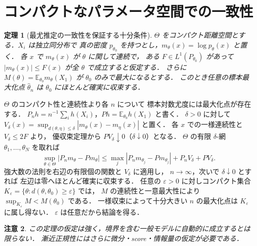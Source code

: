 \documentclass[a5paper,10pt,onecolumn]{jsarticle}
\makeatletter
\theoremstyle{mathnotetheorem}
\newtheorem{theorem}{定理}[section]
\newtheorem{remark}[theorem]{注意}
\renewcommand{\proofname}{証明}
\renewenvironment{proof}[1][\proofname]{%
  \par\pushQED{\qed}\normalfont\topsep4\p@\@plus2\p@\relax
  \trivlist\item[\hskip\labelsep\bfseries #1]\ignorespaces
}{\popQED\endtrivlist\@endpefalse}
\makeatother
\begin{document}
\section{コンパクトなパラメータ空間での一致性}
\begin{theorem}[最尤推定の一致性を保証する十分条件]
$\Theta$ をコンパクト距離空間とする．$X_i$ は独立同分布で
真の密度 $p_{\theta_0}$ を持つとし，$m_\theta(x)=\log p_\theta(x)$ と置く．
各 $x$ で $m_\theta(x)$ が $\theta$ に関して連続で，
ある $F\in L^1(P_{\theta_0})$ があって
$|m_\theta(x)|\le F(x)$ が全 $\theta$ で成立すると仮定する．
さらに $M(\theta)=\mathbb E_{\theta_0}m_\theta(X_1)$ が
$\theta_0$ のみで最大になるとする．
このとき任意の標本最大化点 $\widehat\theta_n$ は
$\theta_0$ にほとんど確実に収束する．
\end{theorem}
\begin{proof}
$\Theta$ のコンパクト性と連続性より各 $n$ について
標本対数尤度には最大化点が存在する．
$P_nh=n^{-1}\sum_i h(X_i)$，$Ph=\mathbb E_{\theta_0}h(X_1)$ と書く．
$\delta>0$ に対して
$V_\delta(x)=\sup_{d(\theta,\eta)\le\delta}
|m_\theta(x)-m_\eta(x)|$ と置く．
各 $x$ での一様連続性と $V_\delta\le2F$ より，
優収束定理から $PV_\delta\downarrow0$（$\delta\downarrow0$）となる．
$\Theta$ の有限 $\delta$-網 $\theta_1,\ldots,\theta_N$ を取れば
\[
 \sup_{\theta\in\Theta}|P_nm_\theta-Pm_\theta|
 \le\max_j|P_nm_{\theta_j}-Pm_{\theta_j}|
      +P_nV_\delta+PV_\delta.
\]
強大数の法則を右辺の有限個の関数と $V_\delta$ に適用し，
$n\to\infty$，次いで $\delta\downarrow0$ とすれば
左辺は零へほとんど確実に収束する．
任意の $\varepsilon>0$ に対しコンパクト集合
$K_\varepsilon=\{\theta:d(\theta,\theta_0)\ge\varepsilon\}$ では，
$M$ の連続性と一意最大性により
$\sup_{K_\varepsilon}M<M(\theta_0)$ である．
一様収束によって十分大きい $n$ の最大化点は
$K_\varepsilon$ に属し得ない．
$\varepsilon$ は任意だから結論を得る．
\end{proof}
\begin{remark}
この定理の仮定は強く，境界を含む一般モデルに自動的に成立するとは限らない．
漸近正規性にはさらに微分・score・情報量の仮定が必要である．
\end{remark}
\end{document}
